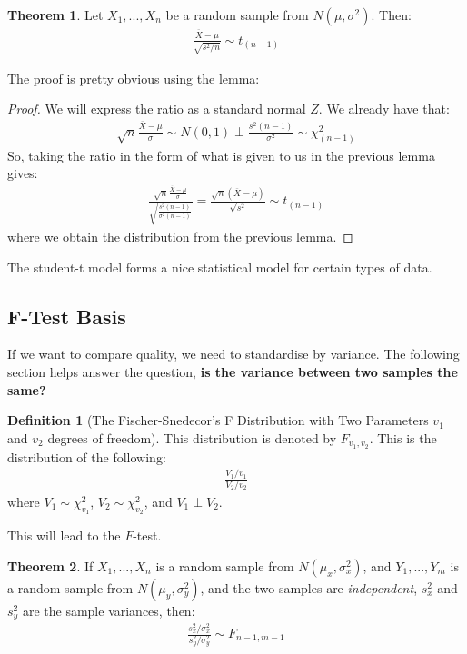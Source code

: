 \documentclass[11pt]{scrartcl}
\theoremstyle{definition}
\newtheorem{theorem}{Theorem}
\newtheorem{definition}{Definition}
\theoremstyle{remark}
\begin{document}
\begin{theorem}
	Let $X_1, ..., X_n$ be a random sample from $N(\mu, \sigma^2)$. Then: 
	\begin{align*}
		\frac{\overline{X} - \mu}{\sqrt{ s^2/n} } \sim t_{(n-1)} 	
	\end{align*}
\end{theorem}
The proof is pretty obvious using the lemma: 
\begin{proof}
	We will express the ratio as a standard normal $Z$. We already have that: 
	\begin{align*}
		\sqrt{n} \frac{\overline{X} - \mu}{\sigma} \sim N(0,1) \perp \frac{s^2 (n-1)}{\sigma^2} \sim \chi^2_{(n-1)} 	
	\end{align*}
	So, taking the ratio in the form of what is given to us in the previous lemma gives: 
	\begin{align*}
		\frac{\sqrt{n} \frac{\overline{X} - \mu}{\sigma}}{\sqrt{\frac{s^2(n-1)}{\sigma^2 (n-1)}}} = \frac{\sqrt{n} (\overline{X} - \mu)}{\sqrt{s^2} } \sim t_{(n-1)} 
	\end{align*}
	where we obtain the distribution from the previous lemma. 
\end{proof}
The student-t model forms a nice statistical model for certain types of data. 

\subsection{F-Test Basis}

If we want to compare quality, we need to standardise by variance. The following section helps answer the question, \textbf{is the variance between two samples the same?}

\begin{definition}[The Fischer-Snedecor's F Distribution with Two Parameters $v_1$ and $v_2$ degrees of freedom] This distribution is denoted by $F_{v_1, v_2} $. This is the distribution of the following: 
\begin{align*}
	\frac{V_1 / v_1}{V_2/v_2}	
\end{align*}
	where $V_1 \sim \chi_{v_1}^2$, $V_2 \sim \chi_{v_2}^2$, and $V_1 \perp V_2$. 
\end{definition}

This will lead to the $F$-test. 

\begin{theorem}
	If $X_1, ..., X_n$ is a random sample from $N(\mu_x, \sigma_x^2)$, and $Y_1, ..., Y_m$ is a random sample from $N(\mu_y, \sigma^2_y)$, and the two samples are \emph{independent}, $s_x^2$ and $s_y^2$ are the sample variances, then: 
	\begin{align*}
		\frac{s^2_x / \sigma^2_x}{s^2_y / \sigma^2_y }	 \sim F_{n-1, m-1} 
	\end{align*}
\end{theorem}
\end{document}
